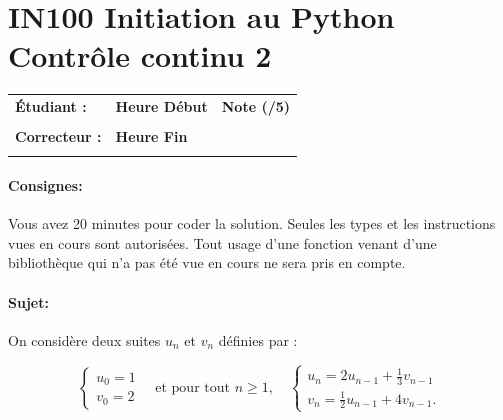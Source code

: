 \documentclass[a4paper,11pt]{article}
\begin{document}
\newtheorem{theo}{Theorem}
\newtheorem{coro}{Corollary}[theo]
\newtheorem{lemme}{Lemma}
\renewcommand{\thecoro}{\thetheo.\arabic{coro}}



\parindent=0cm


\section*{\center IN100 Initiation au Python\\
Contrôle continu 2}

\vspace{-0.3 cm}

\begin{table}[h!]
\centering
\renewcommand{\arraystretch}{1.4} %
\begin{tabular}{|p{10cm}|p{3cm}|p{2cm}|}
\hline
\textbf{Étudiant :} & \textbf{Heure Début }  & \textbf{Note (/5) }  \\
& & \\
\hline
\textbf{Correcteur :} & \textbf{Heure Fin } & \\
& & \\
\hline

\hline
\end{tabular}
\end{table}
\vspace{-0.4 cm}
\paragraph*{Consignes:} Vous avez 20 minutes pour coder la solution. Seules les types et les instructions vues en cours sont autorisées. Tout usage d'une fonction 
venant d'une bibliothèque qui n'a pas été vue en cours ne sera pris en compte. 

\vspace{0.2 cm}
\paragraph*{Sujet:}

On considère deux suites $u_n$ et $v_n$ définies par :

\[
\begin{cases}
u_0 = 1 \\
v_0 = 2
\end{cases}
\quad \text{et pour tout } n \ge 1,
\quad
\begin{cases}
u_{n} = 2 u_{n-1} + \frac{1}{3}v_{n-1} \\
v_{n} = \frac{1}{2} u_{n-1} + 4 v_{n-1}.
\end{cases}
\]
\end{document}
